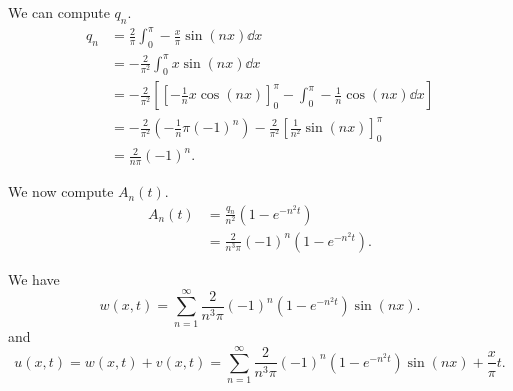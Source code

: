 \documentclass[plain]{pset}
\begin{document}
\begin{solution}
    We can compute \(q_n\).
    \begin{align*}
        q_n & = \frac{2}{\pi}\int_0^\pi -\frac{x}{\pi}\sin(nx) \dd{x}                                                          \\
            & = -\frac{2}{\pi^2}\int_0^\pi x\sin(nx) \dd{x}                                                                    \\
            & = -\frac{2}{\pi^2}\left[\left[-\frac{1}{n}x\cos(nx)\right]_0^\pi - \int_0^\pi -\frac{1}{n}\cos(nx) \dd{x}\right] \\
            & = -\frac{2}{\pi^2}\left(-\frac{1}{n}\pi(-1)^n\right) - \frac{2}{\pi^2}\left[\frac{1}{n^2}\sin(nx)\right]_0^\pi   \\
            & = \frac{2}{n\pi}(-1)^n.
    \end{align*}

    We now compute \(A_n(t)\).
    \begin{align*}
        A_n(t) & = \frac{q_n}{n^2}\left(1 - e^{-n^2t}\right)         \\
               & = \frac{2}{n^3\pi}(-1)^n\left(1 - e^{-n^2t}\right).
    \end{align*}

    We have
    \[w(x,t) = \sum_{n=1}^\infty \frac{2}{n^3\pi}(-1)^n\left(1 - e^{-n^2t}\right)\sin(nx).\]
    and
    \[u(x,t) = w(x,t) + v(x,t) = \sum_{n=1}^\infty \frac{2}{n^3\pi}(-1)^n\left(1 - e^{-n^2t}\right)\sin(nx) + \frac{x}{\pi}t.\]
\end{solution}

\pagebreak
\end{document}

